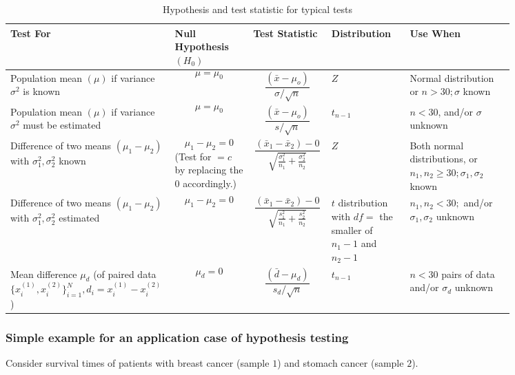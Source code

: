 \begin{table}
    \centering
    \begin{tabular}{|p{0.2\linewidth}|p{0.15\linewidth}|p{0.15\linewidth}|p{0.15\linewidth}|p{0.2\linewidth}|}
        \hline 
        Test For & Null Hypothesis $(H_0)$ & Test Statistic & Distribution & Use When \\
        \hline 
        Population mean $(\mu)$ if variance $\sigma^2$ is known & $$\mu=\mu_0$$ & $$\frac{\left(\bar{x}-\mu_o\right)}{\sigma / \sqrt{n}}$$ & $Z$ & Normal distribution or $n>30 ; \sigma$ known \\
        \hline 
        Population mean $(\mu)$ if variance $\sigma^2$ must be estimated & $$\mu=\mu_0$$ & $$\frac{\left(\bar{x}-\mu_o\right)}{s / \sqrt{n}}$$ & $t_{n-1}$ & $n<30$, and/or $\sigma$ unknown \\
        \hline
        Difference of two means $(\mu_1-\mu_2)$ with $\sigma_1^2,\sigma_2^2$ known & $$\mu_1-\mu_2=0$$ (Test for $=c$ by replacing the $0$ accordingly.) & $$\frac{\left(\bar{x}_1-\bar{x}_2\right)-0}{\sqrt{\frac{\sigma_1^2}{n_1}+\frac{\sigma_2^2}{n_2}}}$$ & $Z$ & Both normal distributions, or $n_1, n_2 \geq 30 ; \sigma_1, \sigma_2$ known \\
        \hline 
        Difference of two means $(\mu_1-\mu_2)$ with $\sigma_1^2,\sigma_2^2$ estimated& $$\mu_1-\mu_2=0$$ & $$\frac{\left(\bar{x}_1-\bar{x}_2\right)-0}{\sqrt{\frac{s_1^2}{n_1}+\frac{s_2^2}{n_2}}}$$ & $t$ distribution with $df=$ the smaller of $n_1-1$ and $n_2-1$ & $n_1, n_2<30 ;$ and/or $\sigma_1, \sigma_2$ unknown \\
        \hline 
        Mean difference $\mu_d$ (of paired data $\{x^{(1)}_i,x^{(2)}_i\}_{i=1}^N, d_i=x^{(1)}_i-x^{(2)}_i$) & $$\mu_d=0$$ & $$\frac{\left(\bar{d}-\mu_d\right)}{s_d / \sqrt{n}}$$ & $t_{n-1}$ & $n<30$ pairs of data and/or $\sigma_d$ unknown \\
        \hline
    \end{tabular}
    \caption{Hypothesis and test statistic for typical tests}
    \label{tab:typical_tests}
\end{table}

\subsubsection{Simple example for an application case of hypothesis testing}

Consider survival times of patients with breast cancer (sample $1$) and stomach cancer (sample $2$).

